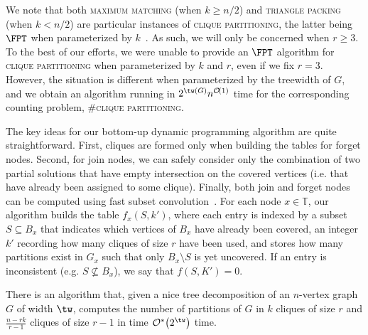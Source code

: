
We note that both \textsc{maximum matching} (when $k \geq n/2$) and \textsc{triangle packing} (when $k < n/2$) are particular instances of \textsc{clique partitioning}, the latter being $\FPT$ when parameterized by $k$~\citep{triangle_packing}.
As such, we will only be concerned when $r \geq 3$.
To the best of our efforts, we were unable to provide an $\FPT$ algorithm for \textsc{clique partitioning} when parameterized by $k$ and $r$, even if we fix $r = 3$.
However, the situation is different when parameterized by the treewidth of $G$, and we obtain an algorithm running in $2^{\tw(G)}n^{\bigO{1}}$ time for the corresponding counting problem, \textsc{\#clique partitioning}.

The key ideas for our bottom-up dynamic programming algorithm are quite straightforward. First, cliques are formed only when building the tables for forget nodes. Second, for join nodes, we can safely consider only the combination of two partial solutions that have empty intersection on the covered vertices (i.e. that have already been assigned to some clique). Finally, both join and forget nodes can be computed using fast subset convolution~\citep{fourier_mobius}.
For each node $x \in \mathbb{T}$, our algorithm builds the table $f_x(S, k')$, where each entry is indexed by a subset $S \subseteq B_x$ that indicates which vertices of $B_x$ have already been covered, an integer $k'$ recording how many cliques of size $r$ have been used, and stores how many partitions exist in $G_x$ such that only $B_x \setminus S$ is yet uncovered.
If an entry is inconsistent (e.g. $S \nsubseteq B_x$), we say that $f(S, K') = 0$.

\begin{theorem}
    \label{thm:clique_part}
    There is an algorithm that, given a nice tree decomposition of an $n$-vertex graph $G$ of width $\tw$, computes the number of partitions of $G$ in $k$ cliques of size $r$ and $\frac{n - rk}{r-1}$ cliques of size $r-1$ in time $\bigOs{2^{\tw}}$ time.
\end{theorem}

